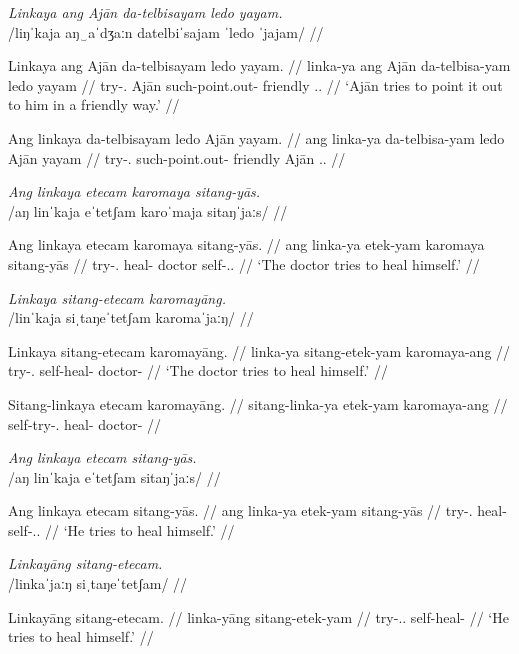 \documentclass[12pt,a4paper]{scrartcl}
\newcommand{\TsgM}{{\Tsg}.{\M}}
\begin{document}
\pex
\a\begingl
\glpreamble \textit{Linkaya ang Ajān da-telbisayam ledo yayam.} \\
	/liŋˈkaja aŋ‿aˈdʒaːn datelbiˈsajam ˈledo ˈjajam/ //

\gla Linkaya ang Ajān da-telbisayam ledo yayam. //
\glb linka-ya ang Ajān da-telbisa-yam ledo yayam //
\glc try-\TsgM{} \Aarg{} Ajān such-point.out-\Ptcp{} friendly \TsgM{}.\Dat{} //
\glft `Ajān tries to point it out to him in a friendly way.' //
\endgl

\a\begingl
\gla Ang linkaya da-telbisayam ledo Ajān yayam. //
\glb ang linka-ya da-telbisa-yam ledo Ajān yayam //
\glc \AgtT{} try-\TsgM{} such-point.out-\Ptcp{} friendly Ajān \TsgM{}.\Dat{} //
\endgl
\xe

\ex\begingl
\glpreamble \textit{Ang linkaya etecam karomaya sitang-yās.} \\
	/aŋ linˈkaja eˈtetʃam karoˈmaja sitaŋˈjaːs/ //

\gla Ang linkaya etecam karomaya sitang-yās. //
\glb ang linka-ya etek-yam karomaya sitang-yās //
\glc \AgtT{} try-\TsgM{} heal-\Ptcp{} doctor self-\TsgM{}.\Parg{} //
\glft `The doctor tries to heal himself.' //
\endgl\xe

\pex
\a\begingl
\glpreamble \textit{Linkaya sitang-etecam karomayāng.} \\
	/linˈkaja siˌtaŋeˈtetʃam karomaˈjaːŋ/ //

\gla Linkaya sitang-etecam karomayāng. //
\glb linka-ya sitang-etek-yam karomaya-ang //
\glc try-\TsgM{} self-heal-\Ptcp{} doctor-\Aarg{} //
\glft `The doctor tries to heal himself.' //
\endgl

\a\ljudge*\begingl
\gla Sitang-linkaya etecam karomayāng. //
\glb sitang-linka-ya etek-yam karomaya-ang //
\glc self-try-\TsgM{} heal-\Ptcp{} doctor-\Aarg{} //
\endgl
\xe

\ex\begingl
\glpreamble \textit{Ang linkaya etecam sitang-yās.} \\
	/aŋ linˈkaja eˈtetʃam sitaŋˈjaːs/ //

\gla Ang linkaya etecam sitang-yās. //
\glb ang linka-ya etek-yam sitang-yās //
\glc \AgtT{} try-\TsgM{} heal-\Ptcp{} self-\TsgM{}.\Parg{} //
\glft `He tries to heal himself.' //
\endgl\xe

\pex
\a\begingl
\glpreamble \textit{Linkayāng sitang-etecam.} \\
	/linkaˈjaːŋ siˌtaŋeˈtetʃam/ //

\gla Linkayāng sitang-etecam. //
\glb linka-yāng sitang-etek-yam //
\glc try-\TsgM{}.\Aarg{} self-heal-\Ptcp{} //
\glft `He tries to heal himself.' //
\endgl
\end{document}
